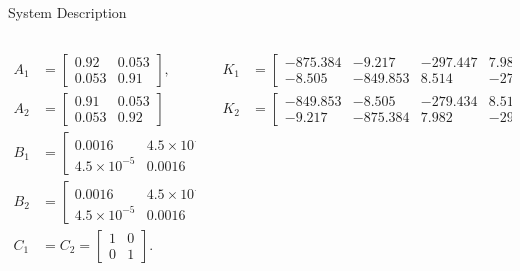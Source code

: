 \begin{slide}{System Description}
  \begin{columns}[c]
    \begin{column}{0.38\textwidth}
      \begin{equation}
        \begin{aligned}
          A_1 & =
          \begin{bmatrix}
            0.92  & 0.053 \\
            0.053 & 0.91
          \end{bmatrix},          \\
          A_2 & = \begin{bmatrix}
            0.91  & 0.053 \\
            0.053 & 0.92
          \end{bmatrix}   \\
          B_1 & =
          \begin{bmatrix}
            0.0016           & 4.5\times10^{-5} \\
            4.5\times10^{-5} & 0.0016
          \end{bmatrix},          \\
          B_2 & = \begin{bmatrix}
            0.0016           & 4.5\times10^{-5} \\
            4.5\times10^{-5} & 0.0016
          \end{bmatrix}, \\
          C_1 & = C_2 =
          \begin{bmatrix}
            1 & 0 \\
            0 & 1
          \end{bmatrix}.
        \end{aligned}
      \end{equation}
    \end{column}
    \hfill%
    \begin{column}{0.58\textwidth}
      \begin{equation}
        \begin{aligned}
          K_1 & = \begin{bmatrix}
            -875.384 & -9.217   & -297.447 & 7.982    \\
            -8.505   & -849.853 & 8.514    & -279.434
          \end{bmatrix}, \\
          K_2 & = \begin{bmatrix}
            -849.853 & -8.505   & -279.434 & 8.514    \\
            -9.217   & -875.384 & 7.982    & -297.447
          \end{bmatrix}.
        \end{aligned}
      \end{equation}
    \end{column}%
  \end{columns}
\end{slide}

